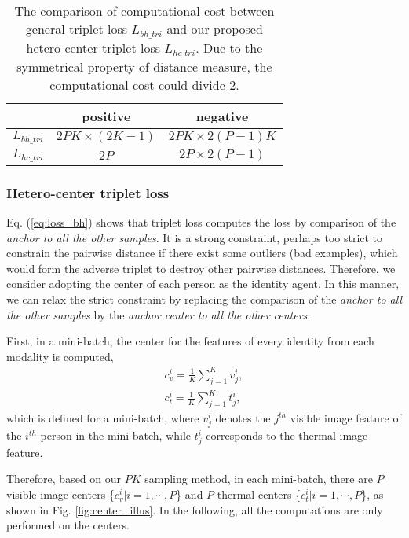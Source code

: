 \documentclass[journal]{IEEEtran}
\begin{document}
\begin{table}
  \centering
  \caption{The comparison of computational cost between general triplet loss $L_{bh\_tri}$ and our proposed hetero-center triplet loss $L_{hc\_tri}$. Due to the symmetrical property of distance measure, the computational cost could divide 2. }\label{tab:cost_com}
  \begin{tabular}{l|c|c}
  \toprule[2pt]
     & positive   & negative  \\ \toprule[1pt]
   $L_{bh\_tri}$ &      $ 2PK \times (2K-1)$    &  $2PK \times 2(P-1)K $        \\ \hline
   $L_{hc\_tri}$ &       $2P$          &    $2P \times 2(P-1)$       \\ \toprule[2pt]
  \end{tabular}
\end{table}

\subsubsection{Hetero-center triplet loss} Eq. (\ref{eq:loss_bh}) shows that triplet loss computes the loss by comparison of the \emph{anchor to all the other samples}. It is a strong constraint, perhaps too strict to constrain the pairwise distance if there exist some outliers (bad examples), which would form the adverse triplet to destroy other pairwise distances. Therefore, we consider adopting the center of each person as the identity agent. In this manner, we can relax the strict constraint by replacing the comparison of the \emph{anchor to all the other samples} by the \emph{anchor center to all the other centers}.

First, in a mini-batch, the center for the features of every identity from each modality is computed,
\begin{align}\label{eq:center}
  c_{v}^{i} = \frac{1}{K} \sum_{j=1}^{K} v_{j}^{i},  \\
  c_{t}^{i} = \frac{1}{K} \sum_{j=1}^{K} t_{j}^{i},  \nonumber
\end{align}
which is defined for a mini-batch, where $v_j^i$ denotes the $j^{th}$ visible image feature of the $i^{th}$ person in the mini-batch, while $t_j^i$ corresponds to the thermal image feature.

Therefore, based on our $PK$ sampling method, in each mini-batch, there are $P$ visible image centers \{$c_{v}^{i}| i=1,\cdots,P$\} and $P$ thermal centers \{$c_{t}^{i}| i=1,\cdots,P$\}, as shown in Fig. \ref{fig:center_illus}. In the following, all the computations are only performed on the centers.
\end{document}
